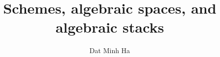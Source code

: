 

\setcounter{section}{-1}





	\title{Schemes, algebraic spaces, and algebraic stacks}
	
	\author{Dat Minh Ha}
	\maketitle
	
	\begin{abstract}
	    
	\end{abstract}
	
	{
      \hypersetup{} 
      \tableofcontents %
    }
    
    
    
    
    
    
    
    
    
    \begin{appendices}
        
        
        
    \end{appendices}
	
	\printbibliography

